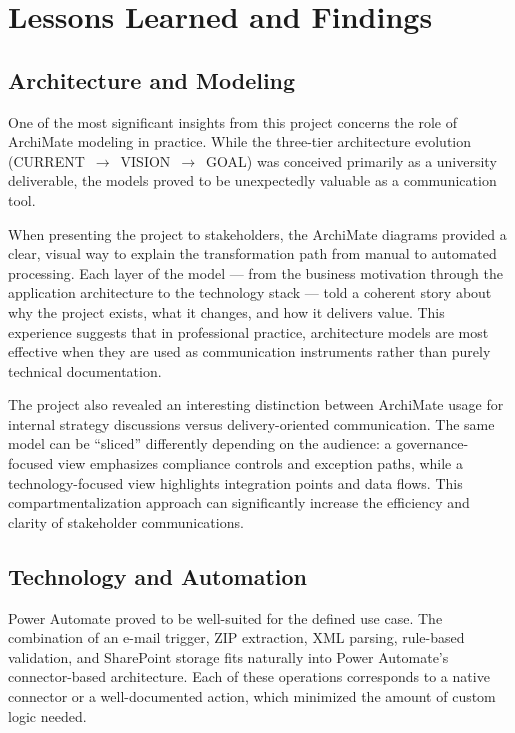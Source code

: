 \documentclass[11pt,a4paper]{article}
\begin{document}
\section{Lessons Learned and Findings}

\subsection{Architecture and Modeling}

One of the most significant insights from this project concerns the role of ArchiMate modeling in practice. While the three-tier architecture evolution (CURRENT~$\rightarrow$~VISION~$\rightarrow$~GOAL) was conceived primarily as a university deliverable, the models proved to be unexpectedly valuable as a communication tool.

When presenting the project to stakeholders, the ArchiMate diagrams provided a clear, visual way to explain the transformation path from manual to automated processing. Each layer of the model --- from the business motivation through the application architecture to the technology stack --- told a coherent story about why the project exists, what it changes, and how it delivers value. This experience suggests that in professional practice, architecture models are most effective when they are used as communication instruments rather than purely technical documentation.

The project also revealed an interesting distinction between ArchiMate usage for internal strategy discussions versus delivery-oriented communication. The same model can be ``sliced'' differently depending on the audience: a governance-focused view emphasizes compliance controls and exception paths, while a technology-focused view highlights integration points and data flows. This compartmentalization approach can significantly increase the efficiency and clarity of stakeholder communications.

\subsection{Technology and Automation}

Power Automate proved to be well-suited for the defined use case. The combination of an e-mail trigger, ZIP extraction, XML parsing, rule-based validation, and SharePoint storage fits naturally into Power Automate's connector-based architecture. Each of these operations corresponds to a native connector or a well-documented action, which minimized the amount of custom logic needed.
\end{document}
